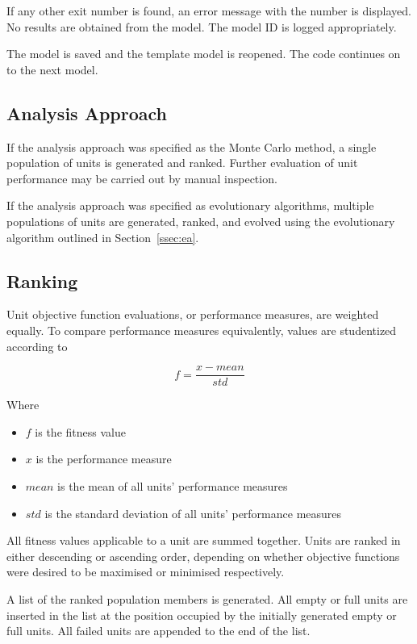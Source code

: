 If any other exit number is found, an error message with the number is displayed. No results are obtained from the model. The model ID is logged appropriately.

The model is saved and the template model is reopened. The code continues on to the next model.

\subsection{Analysis Approach}
\label{ssec:aa}

If the analysis approach was specified as the Monte Carlo method, a single population of units is generated and ranked. Further evaluation of unit performance may be carried out by manual inspection.

If the analysis approach was specified as evolutionary algorithms, multiple populations of units are generated, ranked, and evolved using the evolutionary algorithm outlined in Section~\ref{ssec:ea}.

\subsection{Ranking}
\label{ssec:rank}

Unit objective function evaluations, or performance measures, are weighted equally. To compare performance measures equivalently, values are studentized according to

\begin{equation}
	f=\frac{x-mean}{std}
\end{equation}

Where

\begin{itemize}
	\item $f$ is the fitness value
	\item $x$ is the performance measure
	\item $mean$ is the mean of all units' performance measures
	\item $std$ is the standard deviation of all units' performance measures
\end{itemize}

All fitness values applicable to a unit are summed together. Units are ranked in either descending or ascending order, depending on whether objective functions were desired to be maximised or minimised respectively.

A list of the ranked population members is generated. All empty or full units are inserted in the list at the position occupied by the initially generated empty or full units. All failed units are appended to the end of the list.

